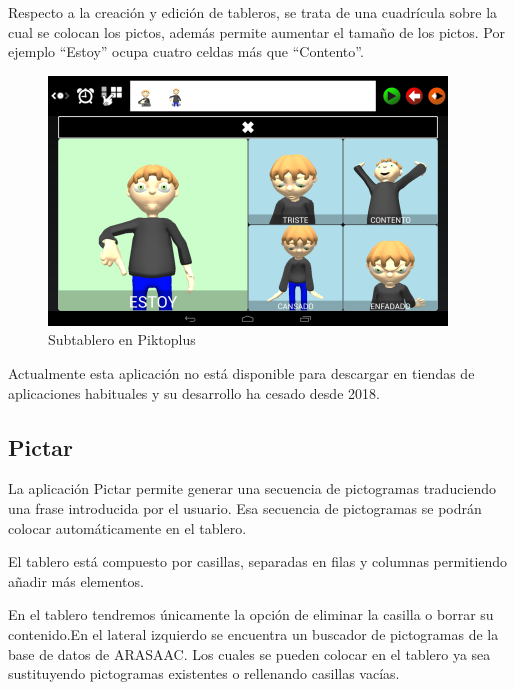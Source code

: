 Respecto a la creación y edición de tableros, se trata de una cuadrícula sobre la cual se colocan los pictos, además permite aumentar el tamaño de los pictos. Por ejemplo “Estoy” ocupa cuatro celdas más que “Contento”.

\begin{figure}[h!]
	\centering
	\includegraphics[width=0.7\linewidth]{Imagenes/Bitmap/Piktoplus2}
	\caption[Subtablero Piktoplus]{Subtablero en Piktoplus}
	\label{fig:piktoplus2}
\end{figure}


Actualmente esta aplicación no está disponible para descargar en tiendas de aplicaciones  habituales y su desarrollo ha cesado desde 2018.

\subsection{Pictar}
La aplicación Pictar permite generar una secuencia de pictogramas traduciendo una frase introducida por el usuario. Esa secuencia de pictogramas se podrán colocar automáticamente en el tablero.


El tablero está compuesto por casillas, separadas en filas y columnas permitiendo añadir más elementos.

En el tablero tendremos únicamente la opción de eliminar la casilla o borrar su contenido.En el lateral izquierdo se encuentra un buscador de pictogramas de la base de datos de ARASAAC. Los cuales se pueden colocar en el tablero ya sea sustituyendo pictogramas existentes o rellenando casillas vacías.


